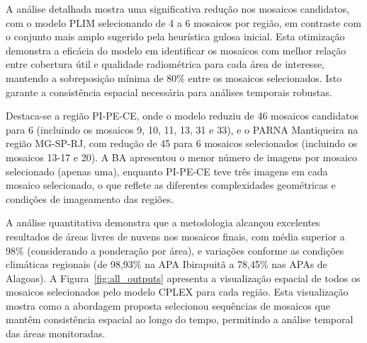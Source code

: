 \documentclass[a4paper,11pt]{article}
\begin{document}
A análise detalhada mostra uma significativa redução nos mosaicos candidatos, com o modelo PLIM selecionando de 4 a 6 mosaicos por região, em contraste com o conjunto mais amplo sugerido pela heurística gulosa inicial. Esta otimização demonstra a eficácia do modelo em identificar os mosaicos com melhor relação entre cobertura útil e qualidade radiométrica para cada área de interesse, mantendo a sobreposição mínima de 80\% entre os mosaicos selecionados. Isto garante a consistência espacial necessária para análises temporais robustas.

Destaca-se a região PI-PE-CE, onde o modelo reduziu de 46 mosaicos candidatos para 6 (incluindo os mosaicos 9, 10, 11, 13, 31 e 33), e o PARNA Mantiqueira na região MG-SP-RJ, com redução de 45 para 6 mosaicos selecionados (incluindo os mosaicos 13-17 e 20). A BA apresentou o menor número de imagens por mosaico selecionado (apenas uma), enquanto PI-PE-CE teve três imagens em cada mosaico selecionado, o que reflete as diferentes complexidades geométricas e condições de imageamento das regiões.

A análise quantitativa demonstra que a metodologia alcançou excelentes resultados de áreas livres de nuvens nos mosaicos finais, com média superior a 98\% (considerando a ponderação por área), e variações conforme as condições climáticas regionais (de 98,93\% na APA Ibirapuitã a 78,45\% nas APAs de Alagoas). A Figura~\ref{fig:all_outputs} apresenta a visualização espacial de todos os mosaicos selecionados pelo modelo CPLEX para cada região. Esta visualização mostra como a abordagem proposta selecionou sequências de mosaicos que mantêm consistência espacial ao longo do tempo, permitindo a análise temporal das áreas monitoradas.
\end{document}
